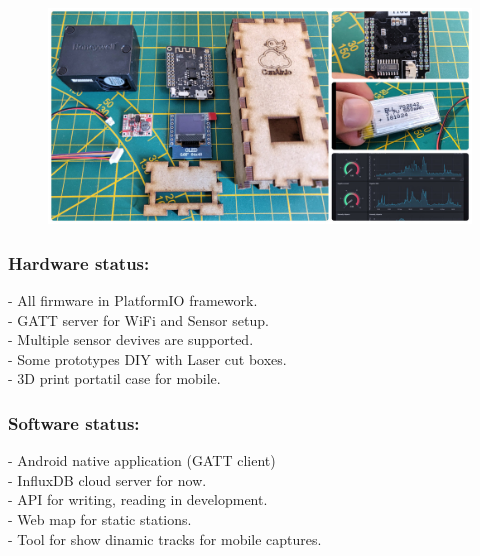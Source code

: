 \documentclass[a0paper,portrait]{baposter}
\begin{document}
\begin{poster}
{%
\begin{figure}
\includegraphics[width=1\linewidth]{images/canariov2collage01.jpg} 
\end{figure}

\subsubsection*{Hardware status:} 

- All firmware in PlatformIO framework.
\vspace{0.1em}\\
- GATT server for WiFi and Sensor setup.
\vspace{0.1em}\\
- Multiple sensor devives are supported.
\vspace{0.1em}\\
- Some prototypes DIY with Laser cut boxes.
\vspace{0.1em}\\
- 3D print portatil case for mobile.

\subsubsection*{Software status:} 

- Android native application (GATT client)
\vspace{0.1em}\\
- InfluxDB cloud server for now.
\vspace{0.1em}\\
- API for writing, reading in development.
\vspace{0.1em}\\
- Web map for static stations.
\vspace{0.1em}\\
- Tool for show dinamic tracks for mobile captures. 
\vspace{0.2em}\\

}
\end{poster}
\end{document}

